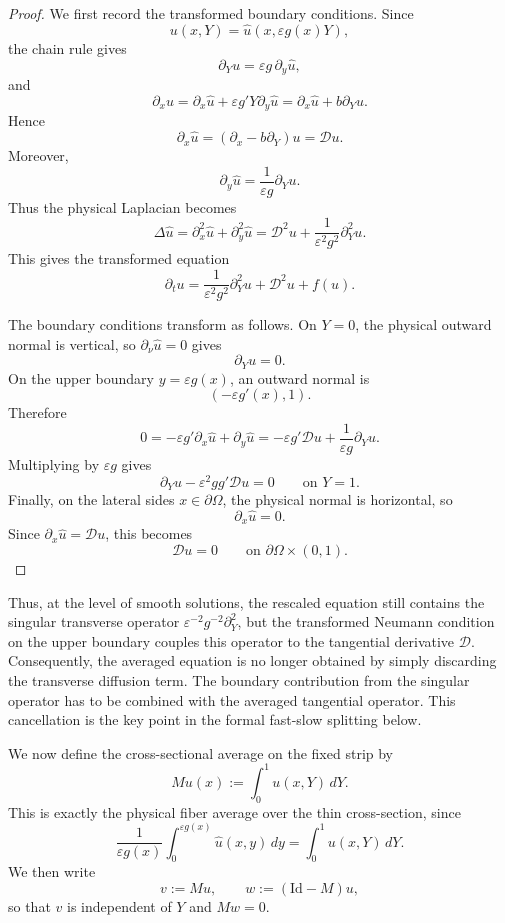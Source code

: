 \documentclass[11pt]{article}
\theoremstyle{definition}
\theoremstyle{remark}
\numberwithin{equation}{section}
\newcommand{\Id}{\mathrm{Id}}
\newcommand{\mc}[1]{\mathcal{#1}}
\begin{document}
\begin{proof}
We first record the transformed boundary conditions. Since
\[
u(x,Y)=\widehat u(x,\varepsilon g(x)Y),
\]
the chain rule gives
\[
\partial_Yu=\varepsilon g\,\partial_y\widehat u,
\]
and
\[
\partial_xu
=
\partial_x\widehat u+\varepsilon g'Y\partial_y\widehat u
=
\partial_x\widehat u+b\partial_Yu.
\]
Hence
\[
\partial_x\widehat u
=
(\partial_x-b\partial_Y)u
=
\mathcal Du.
\]
Moreover,
\[
\partial_y\widehat u
=
\frac1{\varepsilon g}\partial_Yu.
\]
Thus the physical Laplacian becomes
\[
\Delta\widehat u
=
\partial_x^2\widehat u+\partial_y^2\widehat u
=
\mathcal D^2u+\frac1{\varepsilon^2g^2}\partial_Y^2u.
\]
This gives the transformed equation
\[
\partial_tu
=
\frac1{\varepsilon^2g^2}\partial_Y^2u+\mathcal D^2u+f(u).
\]

The boundary conditions transform as follows. On \(Y=0\), the physical outward normal is vertical,
so \(\partial_\nu\widehat u=0\) gives
\[
\partial_Yu=0.
\]
On the upper boundary \(y=\varepsilon g(x)\), an outward normal is
\[
(-\varepsilon g'(x),1).
\]
Therefore
\[
0
=
-\varepsilon g'\partial_x\widehat u+\partial_y\widehat u
=
-\varepsilon g'\mathcal Du+\frac1{\varepsilon g}\partial_Yu.
\]
Multiplying by \(\varepsilon g\) gives
\[
\partial_Yu-\varepsilon^2gg'\mathcal Du=0
\qquad\text{on }Y=1.
\]
Finally, on the lateral sides \(x\in\partial\Omega\), the physical normal is horizontal, so
\[
\partial_x\widehat u=0.
\]
Since \(\partial_x\widehat u=\mathcal Du\), this becomes
\[
\mathcal Du=0
\qquad\text{on }\partial\Omega\times(0,1).
\] 
\end{proof}

Thus, at the level of smooth solutions, the rescaled equation still contains the singular transverse operator \(\varepsilon^{-2}g^{-2}\partial_Y^2\), but the transformed Neumann condition on the upper boundary couples this operator to the tangential derivative \(\mc D\).
Consequently, the averaged equation is no longer obtained by simply discarding the transverse diffusion term.
The boundary contribution from the singular operator has to be combined with the averaged tangential operator.
This cancellation is the key point in the formal fast-slow splitting below.

We now define the cross-sectional average on the fixed strip by
\[
Mu(x):=\int_0^1 u(x,Y)\,dY .
\]
This is exactly the physical fiber average over the thin cross-section, since
\[
\frac1{\varepsilon g(x)}\int_0^{\varepsilon g(x)}
\widehat u(x,y)\,dy
=
\int_0^1 u(x,Y)\,dY .
\]
We then write
\[
v:=Mu,\qquad w:=(\Id-M)u,
\]
so that \(v\) is independent of \(Y\) and \(Mw=0\).
\end{document}
